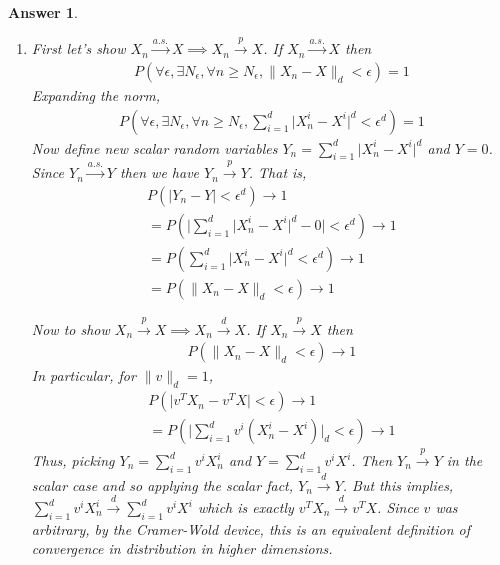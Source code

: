 \documentclass[12pt]{article}
\theoremstyle{colon}
\newtheorem*{answer}{Answer}
\begin{document}
\begin{answer}
  \leavevmode
  \begin{enumerate}[label=\arabic*)]
    \item First let's show $X_n \xrightarrow{a.s.} X \implies X_n \xrightarrow{p} X$. If $X_n \xrightarrow{a.s.} X$ then
      \begin{gather*}
        P(\forall \epsilon, \exists N_\epsilon, \forall n \geq N_\epsilon, \lVert X_n - X \rVert_d < \epsilon) = 1
      \end{gather*}
      Expanding the norm,
      \begin{gather*}
        P(\forall \epsilon, \exists N_\epsilon, \forall n \geq N_\epsilon, \sum_{i = 1}^d \lvert X_n^i - X^i \rvert^d < \epsilon^d) = 1
      \end{gather*}
      Now define new scalar random variables $Y_n = \sum_{i = 1}^d \lvert X_n^i - X^i \rvert^d$ and $Y = 0$.  Since $Y_n \xrightarrow{a.s.} Y$ then we have $Y_n \xrightarrow{p} Y$. That is,
      \begin{gather*}
        P(\lvert Y_n - Y \rvert < \epsilon^d) \rightarrow 1 \\
        = P( \lvert \sum_{i = 1}^d \lvert X_n^i - X^i \rvert^d - 0 \rvert < \epsilon^d ) \rightarrow 1 \\
        = P( \sum_{i = 1}^d \lvert X_n^i - X^i \rvert^d < \epsilon^d ) \rightarrow 1 \\
        = P( \lVert X_n - X \rVert_d < \epsilon ) \rightarrow 1
      \end{gather*}

      Now to show $X_n \xrightarrow{p} X \implies X_n \xrightarrow{d} X$. If $X_n \xrightarrow{p} X$ then
      \begin{gather*}
        P(\lVert X_n - X \rVert_d < \epsilon) \rightarrow 1
      \end{gather*}
      In particular, for $\lVert v \rVert_d = 1$,
      \begin{gather*}
        P(\lvert v^T X_n - v^T X \rvert < \epsilon) \rightarrow 1 \\
        = P(\lvert \sum_{i = 1}^d v^i (X_n^i - X^i) \rvert_d < \epsilon) \rightarrow 1
      \end{gather*}
      Thus, picking $Y_n = \sum_{i = 1}^d v^i X_n^i$ and $Y = \sum_{i = 1}^d v^i X^i$. Then $Y_n \xrightarrow{p} Y$ in the scalar case and so applying the scalar fact, $Y_n \xrightarrow{d} Y$. But this implies, $\sum_{i = 1}^d v^i X_n^i \xrightarrow{d} \sum_{i = 1}^d v^i X^i$ which is exactly $v^T X_n \xrightarrow{d} v^T X$. Since $v$ was arbitrary, by the Cramer-Wold device, this is an equivalent definition of convergence in distribution in higher dimensions.


\end{enumerate}
\end{answer}
\end{document}

